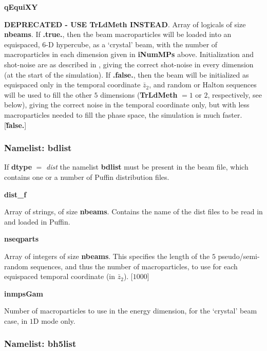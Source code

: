 \documentclass[12pt]{article}%
\begin{document}
{\bf qEquiXY}

{\bf DEPRECATED - USE TrLdMeth INSTEAD}. Array of logicals of size {\bf nbeams}. If {\bf .true.}, then the beam macroparticles will be loaded into an equispaced, $6$-D hypercube, as a `crystal' beam, with the number of macroparticles in each dimension given in {\bf iNumMPs} above. Initialization and shot-noise are as described in \cite{noise1}, giving the correct shot-noise in every dimension (at the start of the simulation). If {\bf .false.}, then the beam will be initialized as equispaced only in the temporal coordinate $\bar{z}_2$, and random or Halton sequences will be used to fill the other $5$ dimensions ({\bf TrLdMeth} $= 1$ or $2$, respectively, see below), giving the correct noise in the temporal coordinate only, but with less macroparticles needed to fill the phase space, the simulation is much faster. [{\bf \.false.}]





%




\subsubsection{Namelist: bdlist}

If {\bf dtype} $=$ {\it dist} the namelist {\bf bdlist} must be present in the beam file, which contains one or a number of Puffin distribution files.

{\bf dist\_f}

Array of strings, of size {\bf nbeams}. Contains the name of the dist files to be read in and loaded in Puffin.

{\bf nseqparts}

Array of integers of size {\bf nbeams}. This specifies the length of the $5$ pseudo/semi-random sequences, and thus the number of macroparticles, to use for each equispaced temporal coordinate (in $\bar{z}_2$). [$1000$]

{\bf inmpsGam}

Number of macroparticles to use in the energy dimension, for the `crystal' beam case, in $1$D mode only.


\subsubsection{Namelist: bh5list}
\end{document}

